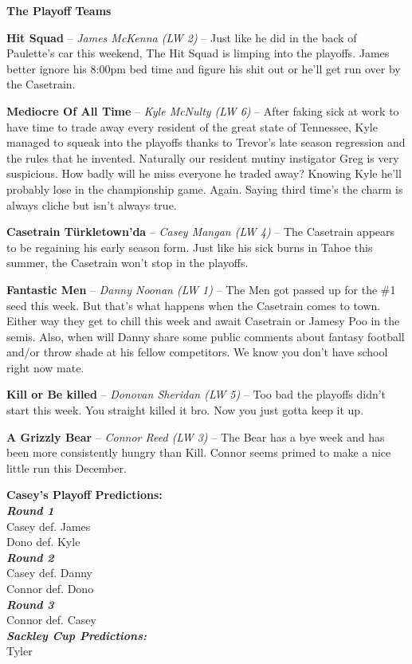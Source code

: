 \documentclass[11pt,letterpaper]{article}
\begin{document}
\textbf{The Playoff Teams}
\begin{etaremune}
\setcounter{enumi}{7}
\item \textbf{Hit Squad} -- \textit{James McKenna (LW 2)} -- Just like he did in the back of Paulette's car this weekend, The Hit Squad is limping into the playoffs. James better ignore his 8:00pm bed time and figure his shit out or he'll get run over by the Casetrain. 
\item \textbf{Mediocre Of All Time} -- \textit{Kyle McNulty (LW 6)} -- After faking sick at work to have time to trade away every resident of the great state of Tennessee, Kyle managed to squeak into the playoffs thanks to Trevor's late season regression and the rules that he invented. Naturally our resident mutiny instigator Greg is very suspicious. How badly will he miss everyone he traded away? Knowing Kyle he'll probably lose in the championship game. Again. Saying third time's the charm is always cliche but isn't always true. 
\item \textbf{Casetrain T\"{u}rkletown'da} -- \textit{Casey Mangan (LW 4)} -- The Casetrain appears to be regaining his early season form. Just like his sick burns in Tahoe this summer, the Casetrain won't stop in the playoffs. 
\item \textbf{Fantastic Men} -- \textit{Danny Noonan (LW 1)} -- The Men got passed up for the \#1 seed this week. But that's what happens when the Casetrain comes to town. Either way they get to chill this week and await Casetrain or Jamesy Poo in the semis. Also, when will Danny share some public comments about fantasy football and/or throw shade at his fellow competitors. We know you don't have school right now mate. 
\item \textbf{Kill or Be killed} -- \textit{Donovan Sheridan (LW 5)} -- Too bad the playoffs didn't start this week. You straight killed it bro. Now you just gotta keep it up. 
\item \textbf{A Grizzly Bear} -- \textit{Connor Reed (LW 3)} -- The Bear has a bye week and has been more consistently hungry than Kill. Connor seems primed to make a nice little run this December. 
\end{etaremune}
\bigskip\textbf{Casey's Playoff Predictions:}
\\[2mm]\textit{\textbf{Round 1}}
\\\indent Casey def. James
\\\indent Dono def. Kyle
\\[2mm]\textit{\textbf{Round 2}}
\\\indent Casey def. Danny
\\\indent Connor def. Dono
\\[2mm]\textit{\textbf{Round 3}}
\\\indent Connor def. Casey 
\\[2mm]\textit{\textbf{Sackley Cup Predictions:}}
\\\indent Tyler 
\end{document}
